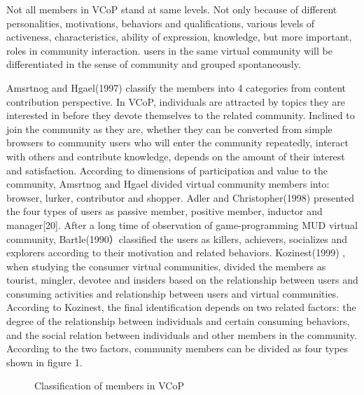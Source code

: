 \documentclass{elsarticle}
\begin{document}
Not all members in VCoP stand at same levels. Not only because of  different personalities, motivations,
behaviors and qualifications, various levels of activeness,
characteristics, ability of expression, knowledge, but more important, roles in
community interaction. users in the same virtual community will be
differentiated in the sense of community and grouped spontaneously. 

Amsrtnog and Hgael(1997) classify the members into 4 categories from
content contribution perspective. In VCoP, individuals are attracted
by topics they are interested in before they devote themselves to the
related community. Inclined to join the community as they are, whether
they can be converted from simple browsers to community users who will
enter the community repeatedly, interact with others and contribute
knowledge, depends on the amount of their interest and
satisfaction. According to dimensions of participation and value to
the community, Amsrtnog and Hgael divided virtual community members  into: browser, lurker, contributor and shopper. Adler and Christopher(1998) presented the four types of users as passive member, positive member, inductor and manager[20]. After a long time of observation of game-programming MUD virtual community, Bartle(1990）classified the users as killers, achievers, socializes and explorers according to their motivation and related behaviors. Kozinest(1999) , when studying the consumer virtual communities, divided the members as tourist, mingler, devotee and insiders based on the relationship between users and consuming activities and relationship between users and virtual communities. According to Kozinest, the final identification depends on two related factors: the degree of the relationship between individuals and certain consuming behaviors, and the social relation between individuals and other members in the community. According to the two factors, community members can be divided as four types shown in figure 1.   
\begin{figure}[htpb]
  \centering
  \caption{Classification of members in VCoP}
  \label{fig:classification}
\end{figure}
\end{document}
